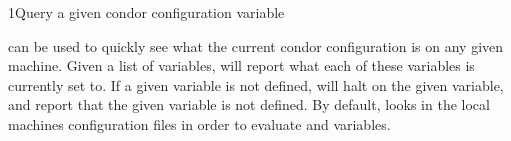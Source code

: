 \begin{ManPage}{}{1}{Query a given condor configuration variable}
\label{man-condor-config-val}
\Synopsis {}

\Description

 can be used to quickly see what the current condor
configuration is on any given machine.  Given a list of variables, 
 will report what each of these variables is currently set
to.  If a given variable is not defined,  will halt on 
the given variable, and report that the given variable is not defined.
By default,  looks in the local machines configuration 
files in order to evaluate and variables.  

\begin{Options}
\end{Options}

\end{ManPage}
